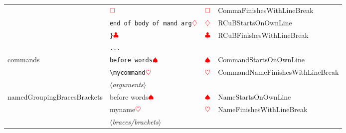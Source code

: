 \begin{longtable}{llll}
		                                                       & $\color{red}\square$                                      & $\color{red}\square$            & CommaFinishesWithLineBreak                                        \\
		                                                       & \verb!end of body of mand arg!$\color{red}\diamondsuit$               & $\color{red}\diamondsuit$                   & RCuBStartsOnOwnLine                                               \\
		                                                       & \verb!}!$\color{red}\clubsuit$                               & $\color{red}\clubsuit$             & RCuBFinishesWithLineBreak                                         \\
		                                                       & \verb!...!                                                        &                                         &                                                                   \\
		\cmidrule{2-4}
		commands                                               & \verb!before words!$\color{red}\spadesuit$                        & $\color{red}\spadesuit$                 & CommandStartsOnOwnLine                                            \\
		                                                       & \verb!\mycommand!$\color{red}\heartsuit$                           & $\color{red}\heartsuit$                  & CommandNameFinishesWithLineBreak                                  \\
		                                                       & $\langle$\itshape{arguments}$\rangle$                             &                                         &                                                                   \\
		\cmidrule{2-4}
		namedGroupingBracesBrackets                            & before words$\color{red}\spadesuit$                               & $\color{red}\spadesuit$                 & NameStartsOnOwnLine                                               \\
		                                                       & myname$\color{red}\heartsuit$                                      & $\color{red}\heartsuit$                  & NameFinishesWithLineBreak                                         \\
		                                                       & $\langle$\itshape{braces/brackets}$\rangle$                       &                                         &                                                                   \\

\end{longtable}
